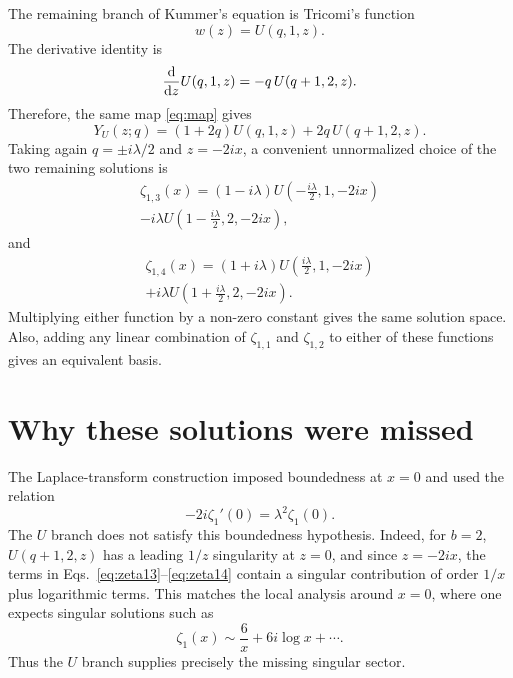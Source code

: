 \documentclass[%
 aip,
 jmp,%
 amsmath,amssymb,
 reprint,%
]{revtex4-2}
\begin{document}
The remaining branch of Kummer's equation is Tricomi's function
\begin{equation}
w(z)=U(q,1,z).
\end{equation}
The derivative identity is
\begin{equation}
\dv{}{z}U(q,1,z)=-q\,U(q+1,2,z).
\end{equation}
Therefore, the same map \eqref{eq:map} gives
\begin{equation}
\label{eq:Ubranch}
Y_U(z;q)
=(1+2q)U(q,1,z)
+2q\,U(q+1,2,z).
\end{equation}
Taking again $q=\pm i\lambda/2$ and $z=-2ix$, a convenient unnormalized
choice of the two remaining solutions is
\begin{equation}
\label{eq:zeta13}
\begin{multlined}
\zeta_{1,3}(x)
=(1-i\lambda)U\left(-\frac{i\lambda}{2},1,-2ix\right)\\
-i\lambda U\left(1-\frac{i\lambda}{2},2,-2ix\right),
\end{multlined}
\end{equation}
and
\begin{equation}
\label{eq:zeta14}
\begin{multlined}
\zeta_{1,4}(x)
=(1+i\lambda)U\left(\frac{i\lambda}{2},1,-2ix\right)\\
+i\lambda U\left(1+\frac{i\lambda}{2},2,-2ix\right).
\end{multlined}
\end{equation}
Multiplying either function by a non-zero constant gives the same solution
space.  Also, adding any linear combination of $\zeta_{1,1}$ and
$\zeta_{1,2}$ to either of these functions gives an equivalent basis.

\section{Why these solutions were missed}

The Laplace-transform construction imposed boundedness at $x=0$ and used the
relation
\begin{equation}
-2i\zeta_1'(0)=\lambda^2\zeta_1(0).
\end{equation}
The $U$ branch does not satisfy this boundedness hypothesis.  Indeed, for
$b=2$, $U(q+1,2,z)$ has a leading $1/z$ singularity at $z=0$, and since
$z=-2ix$, the terms in Eqs.~\eqref{eq:zeta13}--\eqref{eq:zeta14} contain a
singular contribution of order $1/x$ plus logarithmic terms.  This matches the
local analysis around $x=0$, where one expects singular solutions such as
\begin{equation}
\zeta_1(x)\sim \frac{6}{x}+6i\log x+\cdots.
\end{equation}
Thus the $U$ branch supplies precisely the missing singular sector.
\end{document}
